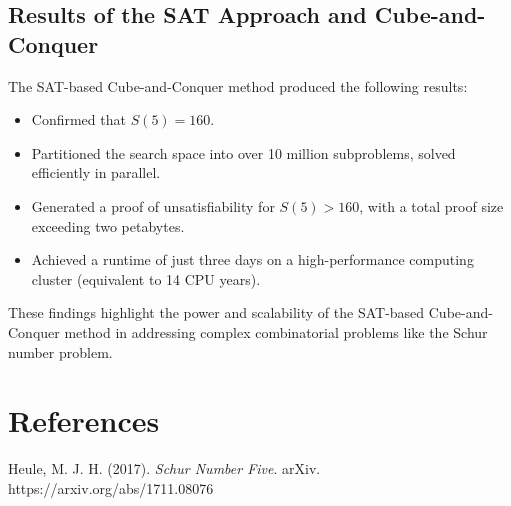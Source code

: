 \documentclass{article}
\begin{document}
\subsection{Results of the SAT Approach and Cube-and-Conquer}
The SAT-based Cube-and-Conquer method produced the following results:
\begin{itemize}
    \item Confirmed that \( S(5) = 160 \).
    \item Partitioned the search space into over 10 million subproblems, solved efficiently in parallel.
    \item Generated a proof of unsatisfiability for \( S(5) > 160 \), with a total proof size exceeding two petabytes.
    \item Achieved a runtime of just three days on a high-performance computing cluster (equivalent to 14 CPU years).
\end{itemize}

These findings highlight the power and scalability of the SAT-based Cube-and-Conquer method in addressing complex combinatorial problems like the Schur number problem.

\section*{References}
Heule, M. J. H. (2017). \textit{Schur Number Five}. arXiv. https://arxiv.org/abs/1711.08076
\end{document}
